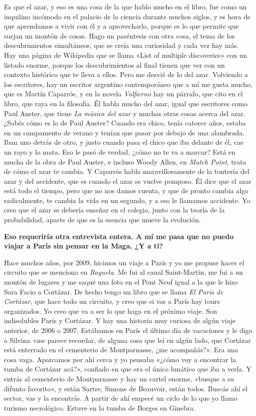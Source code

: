 \documentclass[11pt,a4paper]{article}
\newcommand{\preg}[1]{\textbf{#1}}
\begin{document}
Es que el azar, y eso es una cosa de la que hablo mucho en el libro, fue como un inquilino incómodo en el palacio de la ciencia durante muchos siglos, y es hora de que aprendamos a vivir con él y a aprovecharlo, porque es lo que permite que surjan un montón de cosas. Hago un paréntesis con otra cosa, el tema de los descubrimientos simultáneos, que se creía una curiosidad y cada vez hay más. Hay una página de Wikipedia que se llama «List of multiple discoveries» con un listado enorme, porque los descubrimientos al final tienen que ver con un contexto histórico que te lleva a ellos. Pero me desvié de lo del azar. Volviendo a los escritores, hay un escritor argentino contemporáneo que a mí me gusta mucho, que es Martín Caparrós, y en la novela \emph{Valfierno} hay un párrafo, que cito en el libro, que raya en la filosofía. Él habla mucho del azar, igual que escritores como Paul Auster, que tiene \emph{La música del azar} y muchas otras cosas acerca del azar. ¿Sabés cómo es lo de Paul Auster? Cuando era chico, tenía catorce años, estaba en un campamento de verano y tenían que pasar por debajo de una alambrada. Iban uno detrás de otro, y justo cuando pasa el chico que iba delante de él, cae un rayo y lo mata. Eso le pasó de verdad, ¿cómo no te va a marcar? Está en mucha de la obra de Paul Auster, e incluso Woody Allen, en \emph{Match Point}, trata de cómo el azar te cambia. Y Caparrós habla maravillosamente de la tontería del azar y del accidente, que es cuando el azar se vuelve pomposo. Él dice que el azar está todo el tiempo, pero que no nos damos cuenta, y que de pronto cambia algo radicalmente, te cambia la vida en un segundo, y a eso le llamamos accidente. Yo creo que el azar se debería enseñar en el colegio, junto con la teoría de la probabilidad, aparte de que es la esencia que mueve la evolución.

\preg{Eso requeriría otra entrevista entera. A mí me pasa que no puedo viajar a París sin pensar en la Maga. ¿Y a ti?}

Hace muchos años, por 2009, hicimos un viaje a París y yo me propuse hacer el circuito que se menciona en \emph{Rayuela}. Me fui al canal Saint-Martin, me fui a un montón de lugares y me saqué una foto en el Pont Neuf igual a la que le hizo Sara Facio a Cortázar. De hecho tengo un libro que se llama \emph{El París de Cortázar}, que hace todo un circuito, y creo que si vas a París hay tours organizados. Yo creo que va a ser lo que haga en el próximo viaje. Son indisolubles París y Cortázar. Y hay una historia muy curiosa de algún viaje anterior, de 2006 o 2007. Estábamos en París el último día de vacaciones y le digo a Silvina «me parece recordar, de alguna cosa que leí en algún lado, que Cortázar está enterrado en el cementerio de Montparnasse, ¿me acompañás?». Era una cosa vaga. Aparcamos por ahí cerca y yo pensaba «¿cómo voy a encontrar la tumba de Cortázar acá?», confiado en que era el único lunático que iba a verla. Y entrás al cementerio de Montparnasse y hay un cartel enorme, «busque a su difunto favorito», y están Sartre, Simone de Beauvoir, están todos. Buscás ahí el sector, vas y la encontrás. A partir de ahí empecé un ciclo de lo que yo llamo turismo necrológico. Estuve en la tumba de Borges en Ginebra.
\end{document}
